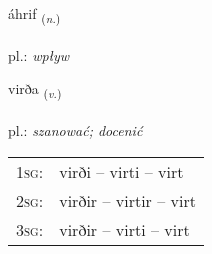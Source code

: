 \documentclass[frontgrid, backgrid]{flacards}\usepackage[]{graphicx}\usepackage[]{xcolor}
\begin{document}
{áhrif \small{\textsubscript{(\textit{n.})}} \\[1ex] %
\textphonetic{[auːr̥ɪv]} \\
pl.: \emph{wpływ} \\  [2ex]
\renewcommand*{\arraystretch}{0.8}
}

\renewcommand{\flhead}{\vskip5pt \fboxsep=0pt {\small\bfseries\footnotesize Sagnorð | Verb}}
\renewcommand{\fcfoot}{\vskip5pt \fboxsep=0pt \hspace{2pt}{\small\bfseries\footnotesize 1K}}

\renewcommand{\blhead}{\vskip5pt {\small\bfseries\footnotesize Sagnorð | Verb }}
\renewcommand{\bcfoot}{\vskip5pt \hspace{2pt}{\small\bfseries\footnotesize 1K}}


{virða \small{\textsubscript{(\textit{v.})}} \\[1ex] %
\textphonetic{[vɪrða]} \\
pl.: \emph{szanować; docenić} \\  [2ex]
\renewcommand*{\arraystretch}{0.8}
\begin{tabular}{p{1cm}l}
\textsc{1sg}: & virði -- virti -- virt \\ 
\textsc{2sg}: & virðir -- virtir -- virt \\ 
\textsc{3sg}: & virðir -- virti -- virt \\ 
\end{tabular}
}

\renewcommand{\flhead}{\vskip5pt \fboxsep=0pt {\small\bfseries\footnotesize Sagnorð | Verb}}
\renewcommand{\fcfoot}{\vskip5pt \fboxsep=0pt \hspace{2pt}{\small\bfseries\footnotesize 1K}}

\renewcommand{\blhead}{\vskip5pt {\small\bfseries\footnotesize Sagnorð | Verb }}
\renewcommand{\bcfoot}{\vskip5pt \hspace{2pt}{\small\bfseries\footnotesize 1K}}
\end{document}
